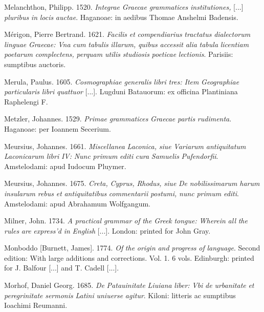 Melanchthon, Philipp. 1520. \textit{Integrae} \textit{Graecae} \textit{grammatices} \textit{institutiones,} [...] \textit{pluribus} \textit{in} \textit{locis} \textit{auctae}. Haganoae: in aedibus Thomae Anshelmi Badensis.

Mérigon, Pierre Bertrand. 1621. \textit{Facilis} \textit{et} \textit{compendiarius} \textit{tractatus} \textit{dialectorum} \textit{linguae} \textit{Graecae:} \textit{Vna} \textit{cum} \textit{tabulis} \textit{illarum,} \textit{quibus} \textit{accessit} \textit{alia} \textit{tabula} \textit{licentiam} \textit{poetarum} \textit{complectens,} \textit{perquam} \textit{utilis} \textit{studiosis} \textit{poeticae} \textit{lectionis}. Parisiis: sumptibus auctoris.

Merula, Paulus. 1605. \textit{Cosmographiae} \textit{generalis} \textit{libri} \textit{tres:} \textit{Item} \textit{Geographiae} \textit{particularis} \textit{libri} \textit{quattuor} [...]. Lugduni Batauorum: ex officina Plantiniana Raphelengi F.

Metzler, Johannes. 1529. \textit{Primae} \textit{grammatices} \textit{Graecae} \textit{partis} \textit{rudimenta}. Haganoae: per Ioannem Secerium.

Meursius, Johannes. 1661. \textit{Miscellanea} \textit{Laconica,} \textit{siue} \textit{Variarum} \textit{antiquitatum} \textit{Laconicarum} \textit{libri} \textit{IV:} \textit{Nunc} \textit{primum} \textit{editi} \textit{cura} \textit{Samuelis} \textit{Pufendorfii}. Amstelodami: apud Iudocum Pluymer.

Meursius, Johannes. 1675. \textit{Creta,} \textit{Cyprus,} \textit{Rhodus,} \textit{siue} \textit{De} \textit{nobilissimarum} \textit{harum} \textit{insularum} \textit{rebus} \textit{et} \textit{antiquitatibus} \textit{commentarii} \textit{postumi,} \textit{nunc} \textit{primum} \textit{editi}. Amstelodami: apud Abrahamum Wolfgangum.

Milner, John. 1734. \textit{A} \textit{practical} \textit{grammar} \textit{of} \textit{the} \textit{Greek} \textit{tongue:} \textit{Wherein} \textit{all} \textit{the} \textit{rules} \textit{are} \textit{express’d} \textit{in} \textit{English} [...]. London: printed for John Gray.

Monboddo [Burnett, James]. 1774. \textit{Of} \textit{the} \textit{origin} \textit{and} \textit{progress} \textit{of} \textit{language}. Second edition: With large additions and corrections. Vol. 1. 6 vols. Edinburgh: printed for J. Balfour [...] and T. Cadell [...].

Morhof, Daniel Georg. 1685. \textit{De} \textit{Patauinitate} \textit{Liuiana} \textit{liber:} \textit{Vbi} \textit{de} \textit{urbanitate} \textit{et} \textit{peregrinitate} \textit{sermonis} \textit{Latini} \textit{uniuerse} \textit{agitur}. Kiloni: litteris ac sumptibus Ioachimi Reumanni.

